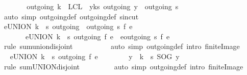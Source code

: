\begin{isabellebody}
\ \ \ \ \isamarkupfalse%
\ \isamarkupfalse%
\ {\isachardoublequoteopen}outgoing{\isacharprime}\ k\ {\isasymunion}\ {\isacharquery}LCL\ {\isacharequal}\ {\isacharparenleft}{\isasymUnion}y{\isasymin}k{\isacharminus}{\isacharbraceleft}s{\isacharbraceright}{\isachardot}\ outgoing\ y{\isacharparenright}\ {\isasymunion}\ outgoing\ s{\isachardoublequoteclose}\isanewline
\ \ \ \ \ \ \isamarkupfalse%
\ {\isacharparenleft}auto\ simp{\isacharcolon}\ outgoing{\isacharunderscore}def\ outgoing{\isacharprime}{\isacharunderscore}def\ s{\isacharunderscore}in{\isacharunderscore}cut{\isacharparenright}\isanewline
\ \ \ \ \isamarkupfalse%
\ \isamarkupfalse%
\ {\isachardoublequoteopen}{\isacharparenleft}{\isasymSum}e{\isasymin}{\isacharparenleft}UNION\ {\isacharparenleft}k\ {\isacharminus}\ {\isacharbraceleft}s{\isacharbraceright}{\isacharparenright}\ outgoing\ {\isasymunion}\ outgoing\ s{\isacharparenright}{\isachardot}\ f\ e{\isacharparenright}\ \isanewline
\ \ \ \ \ \ {\isacharequal}\ {\isacharparenleft}{\isasymSum}e{\isasymin}{\isacharparenleft}UNION\ {\isacharparenleft}k\ {\isacharminus}\ {\isacharbraceleft}s{\isacharbraceright}{\isacharparenright}\ outgoing{\isacharparenright}{\isachardot}\ f\ e{\isacharparenright}\ {\isacharplus}\ {\isacharparenleft}{\isasymSum}e{\isasymin}outgoing\ s{\isachardot}\ f\ e{\isacharparenright}{\isachardoublequoteclose}\ \ \isanewline
\ \ \ \ \ \ \isamarkupfalse%
\ {\isacharparenleft}rule\ sum{\isachardot}union{\isacharunderscore}disjoint{\isacharparenright}\ \isanewline
\ \ \ \ \ \ \ \ \ {\isacharparenleft}auto\ simp{\isacharcolon}\ outgoing{\isacharunderscore}def\ intro{\isacharcolon}\ finite{\isacharunderscore}Image{\isacharparenright}\isanewline
\ \ \ \ \isamarkupfalse%
\ \isamarkupfalse%
\ {\isachardoublequoteopen}{\isacharparenleft}{\isasymSum}e{\isasymin}{\isacharparenleft}UNION\ {\isacharparenleft}k\ {\isacharminus}\ {\isacharbraceleft}s{\isacharbraceright}{\isacharparenright}\ outgoing{\isacharparenright}{\isachardot}\ f\ e{\isacharparenright}\ \isanewline
\ \ \ \ \ \ {\isacharequal}\ {\isacharparenleft}{\isasymSum}y\ {\isasymin}\ k\ {\isacharminus}\ {\isacharbraceleft}s{\isacharbraceright}{\isachardot}\ {\isacharquery}SOG\ y{\isacharparenright}{\isachardoublequoteclose}\isanewline
\ \ \ \ \ \ \isamarkupfalse%
\ {\isacharparenleft}rule\ sum{\isachardot}UNION{\isacharunderscore}disjoint{\isacharparenright}\isanewline
\ \ \ \ \ \ \ \ \ {\isacharparenleft}auto\ simp{\isacharcolon}\ outgoing{\isacharunderscore}def\ intro{\isacharcolon}\ finite{\isacharunderscore}Image{\isacharparenright}\isanewline

\end{isabellebody}
